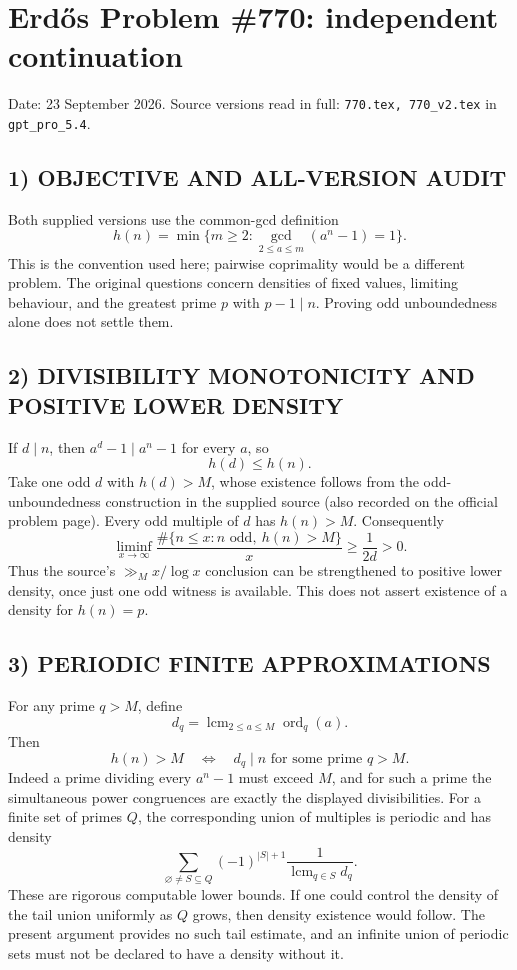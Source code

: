 \section{Erd\H{o}s Problem \#770: independent continuation}
\noindent Date: 23 September 2026. Source versions read in full: \texttt{770.tex, 770\_v2.tex} in \texttt{gpt\_pro\_5.4}.

\subsection*{1) OBJECTIVE AND ALL-VERSION AUDIT}
Both supplied versions use the common-gcd definition
\[
h(n)=\min\{m\ge2:\gcd_{2\le a\le m}(a^n-1)=1\}.
\]
This is the convention used here; pairwise coprimality would be a different problem. The original questions concern densities of fixed values, limiting behaviour, and the greatest prime $p$ with $p-1\mid n$. Proving odd unboundedness alone does not settle them.
\subsection*{2) DIVISIBILITY MONOTONICITY AND POSITIVE LOWER DENSITY}
If $d\mid n$, then $a^d-1\mid a^n-1$ for every $a$, so
\[
h(d)\le h(n). \tag{1}
\]
Take one odd $d$ with $h(d)>M$, whose existence follows from the odd-unboundedness construction in the supplied source (also recorded on the official problem page). Every odd multiple of $d$ has $h(n)>M$. Consequently
\[
\liminf_{x\to\infty}\frac{\#\{n\le x:n\text{ odd},\ h(n)>M\}}x\ge\frac1{2d}>0.
\]
Thus the source's $\gg_M x/\log x$ conclusion can be strengthened to positive lower density, once just one odd witness is available. This does not assert existence of a density for $h(n)=p$.
\subsection*{3) PERIODIC FINITE APPROXIMATIONS}
For any prime $q>M$, define
\[
d_q=\operatorname{lcm}_{2\le a\le M}\operatorname{ord}_q(a).
\]
Then
\[
h(n)>M\quad\Longleftrightarrow\quad d_q\mid n\text{ for some prime }q>M. \tag{2}
\]
Indeed a prime dividing every $a^n-1$ must exceed $M$, and for such a prime the simultaneous power congruences are exactly the displayed divisibilities. For a finite set of primes $Q$, the corresponding union of multiples is periodic and has density
\[
\sum_{\varnothing\ne S\subseteq Q}(-1)^{|S|+1}
\frac1{\operatorname{lcm}_{q\in S}d_q}.
\]
These are rigorous computable lower bounds. If one could control the density of the tail union uniformly as $Q$ grows, then density existence would follow. The present argument provides no such tail estimate, and an infinite union of periodic sets must not be declared to have a density without it.
